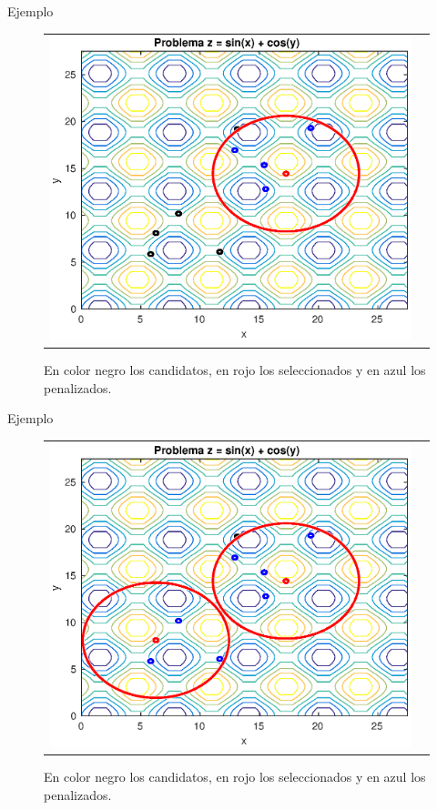 \documentclass{beamer}
\begin{document}
\begin{frame}{Ejemplo}
\begin{figure}[H]
  \centering
  \begin{tabular}{c c}
   \includegraphics[scale=0.6]{Images/2.eps} 
  \end{tabular}
  \caption{\scriptsize En color negro los candidatos, en rojo los seleccionados y en azul los penalizados.}
\end{figure}
\end{frame}

\begin{frame}{Ejemplo}
\begin{figure}[H]
  \centering
  \begin{tabular}{c c}
   \includegraphics[scale=0.6]{Images/3.eps} 
  \end{tabular}
  \caption{\scriptsize En color negro los candidatos, en rojo los seleccionados y en azul los penalizados.}
\end{figure}
\end{frame}
\end{document}
